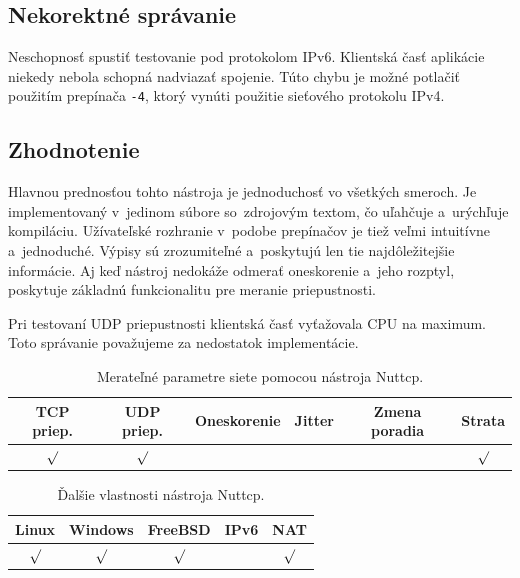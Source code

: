         \subsection{Nekorektné správanie} \label{nuttcp_chyby}
        Neschopnosť spustiť testovanie pod protokolom IPv6.
        Klientská časť aplikácie niekedy nebola schopná nadviazať spojenie. Túto
        chybu je možné potlačiť použitím prepínača \texttt{-4}, ktorý vynúti
        použitie sieťového protokolu IPv4.

        \subsection{Zhodnotenie} \label{nuttcp_zhod}
        Hlavnou prednosťou tohto nástroja je jednoduchosť vo všetkých smeroch.
        Je implementovaný v~jedinom súbore so~zdrojovým textom, čo uľahčuje
        a~urýchľuje
        kompiláciu. Užívateľské rozhranie v~podobe prepínačov je tiež veľmi 
        intuitívne a~jednoduché.  Výpisy sú zrozumiteľné a~poskytujú
        len tie najdôležitejšie informácie. Aj keď nástroj nedokáže odmerať
        oneskorenie a~jeho rozptyl, poskytuje základnú funkcionalitu pre meranie 
        priepustnosti.

        Pri testovaní UDP priepustnosti klientská časť vyťažovala CPU na
        maximum. Toto správanie považujeme za nedostatok implementácie.

        \begin{table}[H]
            \begin{center}
                \begin{tabular}{|c|c|c|c|c|c|}
                    \hline
                    \textbf{TCP priep.}  &  \textbf{UDP priep.}  &
                    \textbf{Oneskorenie} & \textbf{Jitter} &
                    \textbf{Zmena poradia} & \textbf{Strata} \\
                    \hline
                    $\surd$ & $\surd$ & & & & $\surd$\\ 
                    \hline
                \end{tabular}
                \caption{Merateľné parametre siete pomocou nástroja Nuttcp.}
                \label{tab_nuttcp_param}
            \end{center}
        \end{table}

        \begin{table}[H]
            \begin{center}
                \begin{tabular}{|c|c|c|c|c|}
                    \hline
                    \textbf{Linux}  &  \textbf{Windows}  &
                    \textbf{FreeBSD} & \textbf{IPv6} &
                    \textbf{NAT} \\
                    \hline
                    $\surd$ & $\surd$ & $\surd$ &  & $\surd$ \\ 
                    \hline
                \end{tabular}
                \caption{Ďalšie vlastnosti nástroja Nuttcp.}
                \label{tab_nuttcp_vlast}
            \end{center}
        \end{table}


